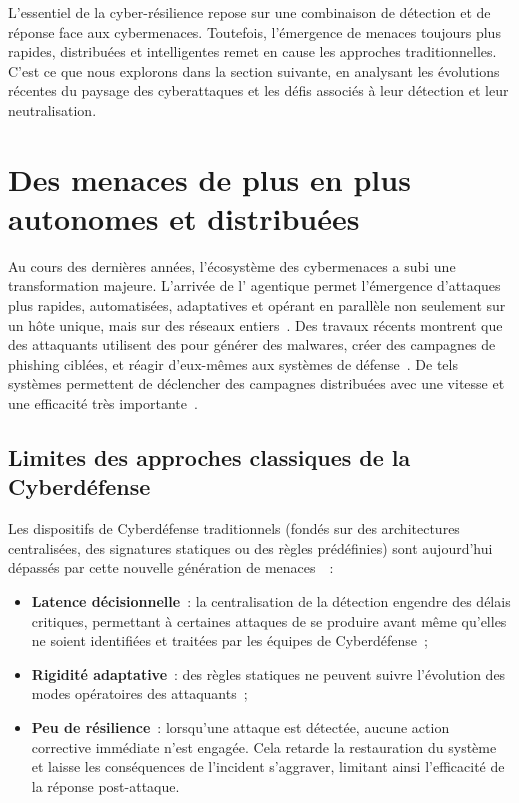 \noindent
L'essentiel de la cyber-résilience repose sur une combinaison de détection et de réponse face aux cybermenaces. Toutefois, l'émergence de menaces toujours plus rapides, distribuées et intelligentes remet en cause les approches traditionnelles. C'est ce que nous explorons dans la section suivante, en analysant les évolutions récentes du paysage des cyberattaques et les défis associés à leur détection et leur neutralisation.


\section{Des menaces de plus en plus autonomes et distribuées}\label{sec:evolution-menaces}

Au cours des dernières années, l'écosystème des cybermenaces a subi une transformation majeure. L'arrivée de l' agentique permet l'émergence d'attaques plus rapides, automatisées, adaptatives et opérant en parallèle non seulement sur un hôte unique, mais sur des réseaux entiers~\cite{Cohen2020}. Des travaux récents montrent que des attaquants utilisent des  pour générer des malwares, créer des campagnes de phishing ciblées, et réagir d'eux-mêmes aux systèmes de défense~\cite{AutoAttacker2024}. De tels systèmes permettent de déclencher des campagnes distribuées avec une vitesse et une efficacité très importante~\cite{AgenticAIThreats2025}.

\subsection*{Limites des approches classiques de la Cyberdéfense}

Les dispositifs de Cyberdéfense traditionnels (fondés sur des architectures centralisées, des signatures statiques ou des règles prédéfinies) sont aujourd'hui dépassés par cette nouvelle génération de menaces~\cite{Kott2023}~:
\begin{itemize}
  \item \textbf{Latence décisionnelle}~: la centralisation de la détection engendre des délais critiques, permettant à certaines attaques de se produire avant même qu'elles ne soient identifiées et traitées par les équipes de Cyberdéfense~;
  \item \textbf{Rigidité adaptative}~: des règles statiques ne peuvent suivre l'évolution des modes opératoires des attaquants~;
  \item \textbf{Peu de résilience}~: lorsqu'une attaque est détectée, aucune action corrective immédiate n'est engagée. Cela retarde la restauration du système et laisse les conséquences de l'incident s'aggraver, limitant ainsi l'efficacité de la réponse post-attaque.
\end{itemize}

